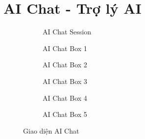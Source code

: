 \section{AI Chat - Trợ lý AI}
\begin{figure}[H]
    \centering
    
    \begin{subfigure}[b]{0.24\textwidth}
        \centering
        \caption{AI Chat Session}
    \end{subfigure}
    \hfill
    \begin{subfigure}[b]{0.24\textwidth}
        \centering
        \caption{AI Chat Box 1}
    \end{subfigure}
    \hfill
    \begin{subfigure}[b]{0.24\textwidth}
        \centering
        \caption{AI Chat Box 2}
    \end{subfigure}
    \hfill
    \begin{subfigure}[b]{0.24\textwidth}
        \centering
        \caption{AI Chat Box 3}
    \end{subfigure}
    
    \vspace{1em}
    
    \begin{subfigure}[b]{0.24\textwidth}
        \centering
        \caption{AI Chat Box 4}
    \end{subfigure}
    \hfill
    \begin{subfigure}[b]{0.24\textwidth}
        \centering
        \caption{AI Chat Box 5}
    \end{subfigure}
    \hfill
    \begin{subfigure}[b]{0.24\textwidth}
    \end{subfigure}
    \hfill
    \begin{subfigure}[b]{0.24\textwidth}
    \end{subfigure}
    
    \vspace{1em}
    \caption{Giao diện AI Chat}
\end{figure}

